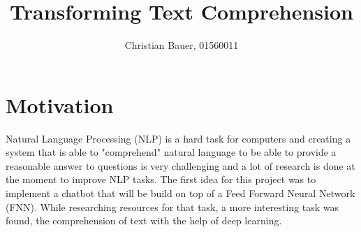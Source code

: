 \usepackage{wrapfig}
\usepackage{caption}
\usepackage{subcaption}

\title{Transforming Text Comprehension}
\author{Christian Bauer, 01560011}
\date{}

% 
% 




\maketitle





\setcounter{tocdepth}{2}
\tableofcontents

\pagebreak

    \section{Motivation}
    \label{sec:motivation}


        Natural Language Processing (NLP) is a hard task for computers and creating a system that is able to "comprehend" natural language to be able to provide a reasonable answer to questions is very challenging and a lot of research is done at the moment to improve NLP tasks.
        The first idea for this project was to implement a chatbot that will be build on top of a Feed Forward Neural Network (FNN).
        While researching resources for that task, a more interesting task was found, the comprehension of text with the help of deep learning.

